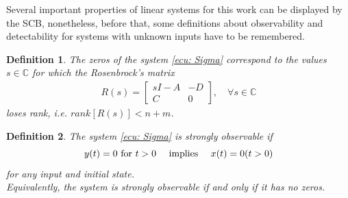 \documentclass[11pt,letterpaper,twoside,openright]{report}
\newtheorem{definition}{Definition}[chapter]
\begin{document}
Several important properties of linear systems for this work can be displayed by the SCB, nonetheless, before that, some definitions about observability and detectability  for systems with unknown inputs have to be remembered.

\begin{definition}
	The zeros of the system \eqref{ecu: Sigma} correspond to the values $s\in \mathbb{C}$ for which the Rosenbrock's matrix 
	\begin{equation}\label{ecu: Rosenbrok}
		\begin{split}
			R(s)=
			\begin{bmatrix}
				sI-A & -D\\
				C & 0	
			\end{bmatrix}, \quad \forall s\in \mathbb{C}
		\end{split}
	\end{equation} 
	loses rank, i.e. $rank[R(s)] < n+m$.
\end{definition}

\begin{definition}
	The system \eqref{ecu: Sigma} is strongly observable if 
	\begin{equation}
		y(t)=0 \textup{ for } t>0  \quad \textup{ implies }  \quad x(t) = 0 (t > 0)
	\end{equation}
	for any input and initial state. \\
	Equivalently, the system is strongly observable if and only if it has no zeros.
\end{definition}
\end{document}
